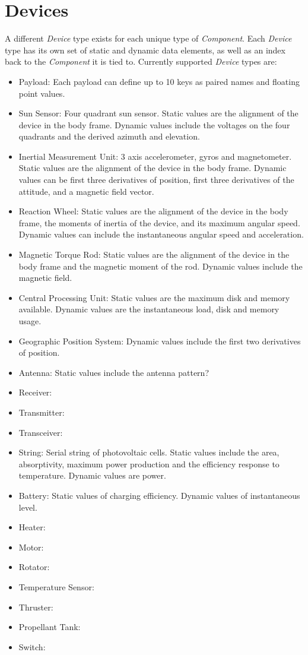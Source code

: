 \documentclass[10pt,letterpaper]{report}
\begin{document}
\section{Devices}
A different \textit{Device} type exists for each unique type of \textit{Component}. Each \textit{Device} type has its own set of static and dynamic data elements, as well as an index back to the \textit{Component} it is tied to. Currently supported \textit{Device} types are:
\begin{itemize}
\item Payload: Each payload can define up to 10 keys as paired names and floating point values.
\item Sun Sensor: Four quadrant sun sensor. Static values are the alignment of the device in the body frame. Dynamic values include the voltages on the four quadrants and the derived azimuth and elevation.
\item Inertial Measurement Unit: 3 axis accelerometer, gyros and magnetometer. Static values are the alignment of the device in the body frame. Dynamic values can be first three derivatives of position, first three derivatives of the attitude, and a magnetic field vector.
\item Reaction Wheel: Static values are the alignment of the device in the body frame, the moments of inertia of the device, and its maximum angular speed. Dynamic values can include the instantaneous angular speed and acceleration.
\item Magnetic Torque Rod: Static values are the alignment of the device in the body frame and the magnetic moment of the rod. Dynamic values include the magnetic field.
\item Central Processing Unit: Static values are the maximum disk and memory available. Dynamic values are the instantaneous load, disk and memory usage.
\item Geographic Position System: Dynamic values include the first two derivatives of position.
\item Antenna: Static values include the antenna pattern?
\item Receiver:
\item Transmitter:
\item Transceiver:
\item String: Serial string of photovoltaic cells. Static values include the area, absorptivity, maximum power production and the efficiency response to temperature. Dynamic values are power.
\item Battery: Static values of charging efficiency. Dynamic values of instantaneous level.
\item Heater:
\item Motor:
\item Rotator:
\item Temperature Sensor:
\item Thruster:
\item Propellant Tank:
\item Switch:
\end{itemize}
\end{document}
